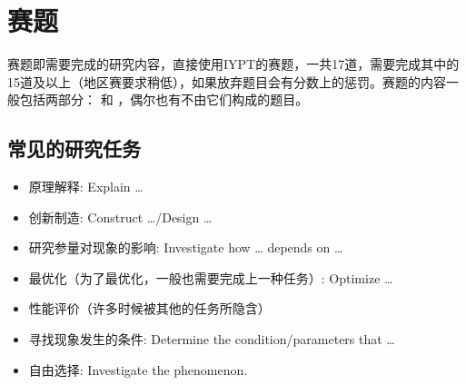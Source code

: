 \documentclass[a4paper,10pt,english]{sphinxmanual}
\begin{document}
\section{赛题}
\label{\detokenize{2. Intro_Tournament:id3}}
赛题即需要完成的研究内容，直接使用IYPT的赛题，一共17道，需要完成其中的15道及以上（地区赛要求稍低），如果放弃题目会有分数上的惩罚。赛题的内容一般包括两部分：  和  ，偶尔也有不由它们构成的题目。


\subsection{常见的研究任务}
\label{\detokenize{2. Intro_Tournament:id4}}\begin{itemize}
\item {} 
原理解释: Explain …

\item {} 
创新制造: Construct …/Design …

\item {} 
研究参量对现象的影响: Investigate how … depends on …

\item {} 
最优化（为了最优化，一般也需要完成上一种任务）: Optimize …

\item {} 
性能评价（许多时候被其他的任务所隐含）

\item {} 
寻找现象发生的条件: Determine the condition/parameters that …

\item {} 
自由选择: Investigate the phenomenon.

\end{itemize}
\end{document}
